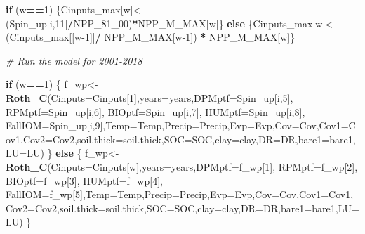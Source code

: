 \documentclass[
  10pt,
  b5paper,
]{book}
\newenvironment{Shaded}{\begin{snugshade}}{\end{snugshade}}
\newcommand{\CommentTok}[1]{\textcolor[rgb]{0.56,0.35,0.01}{\textit{#1}}}
\newcommand{\ControlFlowTok}[1]{\textcolor[rgb]{0.13,0.29,0.53}{\textbf{#1}}}
\newcommand{\DataTypeTok}[1]{\textcolor[rgb]{0.13,0.29,0.53}{#1}}
\newcommand{\DecValTok}[1]{\textcolor[rgb]{0.00,0.00,0.81}{#1}}
\newcommand{\KeywordTok}[1]{\textcolor[rgb]{0.13,0.29,0.53}{\textbf{#1}}}
\newcommand{\NormalTok}[1]{#1}
\newcommand{\OperatorTok}[1]{\textcolor[rgb]{0.81,0.36,0.00}{\textbf{#1}}}
\newcommand{\StringTok}[1]{\textcolor[rgb]{0.31,0.60,0.02}{#1}}
\begin{document}
\begin{Shaded}
\begin{Highlighting}[]
{\ControlFlowTok{if}\NormalTok{ (w}\OperatorTok{==}\DecValTok{1}\NormalTok{) \{Cinputs_max[w]<-(Spin_up[i,}\DecValTok{11}\NormalTok{]}\OperatorTok{/}\NormalTok{NPP_}\DecValTok{81}\NormalTok{_}\DecValTok{00}\NormalTok{)}\OperatorTok{*}\NormalTok{NPP_M_MAX[w]\} }\ControlFlowTok{else}\NormalTok{ \{Cinputs_max[w]<-(Cinputs_max[[w}\DecValTok{-1}\NormalTok{]]}\OperatorTok{/}\StringTok{ }\NormalTok{NPP_M_MAX[w}\DecValTok{-1}\NormalTok{]) }\OperatorTok{*}\StringTok{ }\NormalTok{NPP_M_MAX[w]\} }

\CommentTok{# Run the model for 2001-2018 }

\ControlFlowTok{if}\NormalTok{ (w}\OperatorTok{==}\DecValTok{1}\NormalTok{) \{}
\NormalTok{f_wp<-}\KeywordTok{Roth_C}\NormalTok{(}\DataTypeTok{Cinputs=}\NormalTok{Cinputs[}\DecValTok{1}\NormalTok{],}\DataTypeTok{years=}\NormalTok{years,}\DataTypeTok{DPMptf=}\NormalTok{Spin_up[i,}\DecValTok{5}\NormalTok{], }\DataTypeTok{RPMptf=}\NormalTok{Spin_up[i,}\DecValTok{6}\NormalTok{], }\DataTypeTok{BIOptf=}\NormalTok{Spin_up[i,}\DecValTok{7}\NormalTok{], }\DataTypeTok{HUMptf=}\NormalTok{Spin_up[i,}\DecValTok{8}\NormalTok{], }\DataTypeTok{FallIOM=}\NormalTok{Spin_up[i,}\DecValTok{9}\NormalTok{],}\DataTypeTok{Temp=}\NormalTok{Temp,}\DataTypeTok{Precip=}\NormalTok{Precip,}\DataTypeTok{Evp=}\NormalTok{Evp,}\DataTypeTok{Cov=}\NormalTok{Cov,}\DataTypeTok{Cov1=}\NormalTok{Cov1,}\DataTypeTok{Cov2=}\NormalTok{Cov2,}\DataTypeTok{soil.thick=}\NormalTok{soil.thick,}\DataTypeTok{SOC=}\NormalTok{SOC,}\DataTypeTok{clay=}\NormalTok{clay,}\DataTypeTok{DR=}\NormalTok{DR,}\DataTypeTok{bare1=}\NormalTok{bare1,}\DataTypeTok{LU=}\NormalTok{LU)}
\NormalTok{\} }\ControlFlowTok{else}\NormalTok{ \{}
\NormalTok{f_wp<-}\KeywordTok{Roth_C}\NormalTok{(}\DataTypeTok{Cinputs=}\NormalTok{Cinputs[w],}\DataTypeTok{years=}\NormalTok{years,}\DataTypeTok{DPMptf=}\NormalTok{f_wp[}\DecValTok{1}\NormalTok{], }\DataTypeTok{RPMptf=}\NormalTok{f_wp[}\DecValTok{2}\NormalTok{], }\DataTypeTok{BIOptf=}\NormalTok{f_wp[}\DecValTok{3}\NormalTok{], }\DataTypeTok{HUMptf=}\NormalTok{f_wp[}\DecValTok{4}\NormalTok{], }\DataTypeTok{FallIOM=}\NormalTok{f_wp[}\DecValTok{5}\NormalTok{],}\DataTypeTok{Temp=}\NormalTok{Temp,}\DataTypeTok{Precip=}\NormalTok{Precip,}\DataTypeTok{Evp=}\NormalTok{Evp,}\DataTypeTok{Cov=}\NormalTok{Cov,}\DataTypeTok{Cov1=}\NormalTok{Cov1,}\DataTypeTok{Cov2=}\NormalTok{Cov2,}\DataTypeTok{soil.thick=}\NormalTok{soil.thick,}\DataTypeTok{SOC=}\NormalTok{SOC,}\DataTypeTok{clay=}\NormalTok{clay,}\DataTypeTok{DR=}\NormalTok{DR,}\DataTypeTok{bare1=}\NormalTok{bare1,}\DataTypeTok{LU=}\NormalTok{LU)}
\NormalTok{\}}

}
\end{Highlighting}
\end{Shaded}
\end{document}
